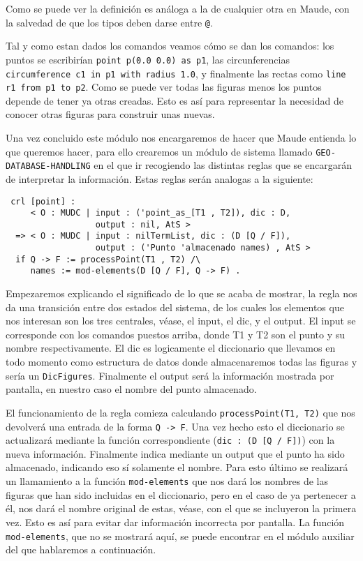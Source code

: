 Como se puede ver la definición es análoga a la de cualquier otra en Maude, con la salvedad de que los tipos deben darse entre \verb"@". \par 

Tal y como estan dados los comandos veamos cómo se dan los comandos: los puntos se escribirían \verb"point p(0.0 0.0) as p1", las circunferencias \texttt{circumference c1 in p1 with radius 1.0}, y finalmente las rectas como \verb"line r1 from p1 to p2". Como se puede ver todas las figuras menos los puntos depende de tener ya otras creadas. Esto es así para representar la necesidad de conocer otras figuras para construir unas nuevas.\par

Una vez concluido este módulo nos encargaremos de hacer que Maude entienda lo que queremos hacer, para ello crearemos un módulo de sistema llamado \verb"GEO-DATABASE-HANDLING" en el que ir recogiendo las distintas reglas que se encargarán de interpretar la información. Estas reglas serán analogas a la siguiente:\par

{\codesize
\begin{verbatim}
 crl [point] :
     < O : MUDC | input : ('point_as_[T1 , T2]), dic : D,
                  output : nil, AtS >
  => < O : MUDC | input : nilTermList, dic : (D [Q / F]),
                  output : ('Punto 'almacenado names) , AtS >
  if Q -> F := processPoint(T1 , T2) /\
     names := mod-elements(D [Q / F], Q -> F) .
\end{verbatim}
}
Empezaremos explicando el significado de lo que se acaba de mostrar, la regla nos da una transición entre dos estados del sistema, de los cuales los elementos que nos interesan son los tres centrales, véase, el input, el dic, y el output. El input se corresponde con los comandos puestos arriba, donde T1 y T2 son el punto y su nombre respectivamente. El dic es logicamente el diccionario que llevamos en todo momento como estructura de datos donde almacenaremos todas las figuras y sería un \verb"DicFigures". Finalmente el output será la información mostrada por pantalla, en nuestro caso el nombre del punto almacenado. \par

El funcionamiento de la regla comieza calculando \texttt{processPoint(T1, T2)} que nos devolverá una entrada de la forma \texttt{Q -> F}. Una vez hecho esto el diccionario se actualizará mediante la función correspondiente (\verb"dic : (D [Q / F])") con la nueva información. Finalmente indica mediante un output que el punto ha sido almacenado, indicando eso sí solamente el nombre. Para esto último se realizará un llamamiento a la función \texttt{mod-elements} que nos dará los nombres de las figuras que han sido incluidas en el diccionario, pero en el caso de ya pertenecer a él, nos dará el nombre original de estas, véase, con el que se incluyeron la primera vez. Esto es así para evitar dar información incorrecta por pantalla. La función \texttt{mod-elements}, que no se mostrará aquí, se puede encontrar en el módulo auxiliar del que hablaremos a continuación.\par

